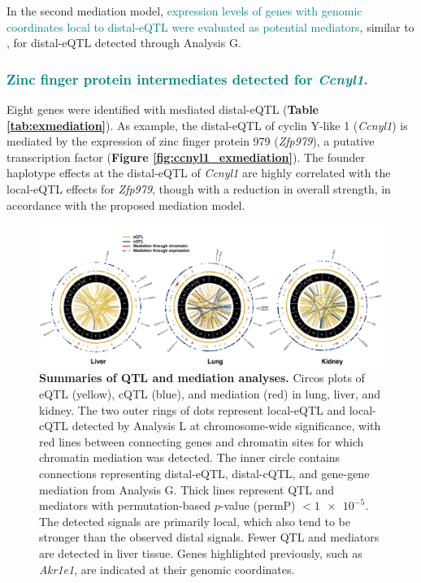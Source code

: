 \documentclass[9pt,twocolumn,twoside]{gsajnl}
\newcommand{\GKinline}[1]{\textcolor{teal}{#1}}
\begin{document}
In the second mediation model, \GKinline{expression levels of genes with genomic coordinates local to distal-eQTL were evaluated as potential mediators}, similar to \cite{Keller2018}, for distal-eQTL detected through Analysis G. 
\subsubsection{\GKinline{Zinc finger protein intermediates detected for \textit{Ccnyl1}.}}
Eight genes were identified with mediated distal-eQTL (\textbf{Table \ref{tab:exmediation}}). As example, the distal-eQTL of cyclin Y-like 1 (\textit{Ccnyl1}) is mediated by the expression of zinc finger protein 979 (\textit{Zfp979}), a putative transcription factor (\textbf{Figure \ref{fig:ccnyl1_exmediation}}). The founder haplotype effects at the distal-eQTL of \textit{Ccnyl1} are highly correlated with the local-eQTL effects for \textit{Zfp979}, though with a reduction in overall strength, in accordance with the proposed mediation model.

\begin{figure}[h!]
\renewcommand{\familydefault}{\sfdefault}\normalfont
\centering
\includegraphics[width=\textwidth, trim={0in 0in 0in 0in}, clip]{figs/circos_over_tissues.pdf}
\caption{\textbf{Summaries of QTL and mediation analyses.} Circos plots of eQTL (yellow), cQTL (blue), and mediation (red) in lung, liver, and kidney. The two outer rings of dots represent local-eQTL and local-cQTL detected by Analysis L at chromosome-wide significance, with red lines between connecting genes and chromatin sites for which chromatin mediation was detected. The inner circle contains connections representing distal-eQTL, distal-cQTL, and gene-gene mediation from Analysis G. Thick lines represent QTL and mediators with permutation-based $p$-value (permP) $< \num{1e-5}$. The detected signals are primarily local, which also tend to be stronger than the observed distal signals. Fewer QTL and mediators are detected in liver tissue. 
Genes highlighted previously, such as \textit{Akr1e1}, are indicated at their genomic coordinates.
\label{fig:circos_plot}}
\end{figure}
\end{document}
